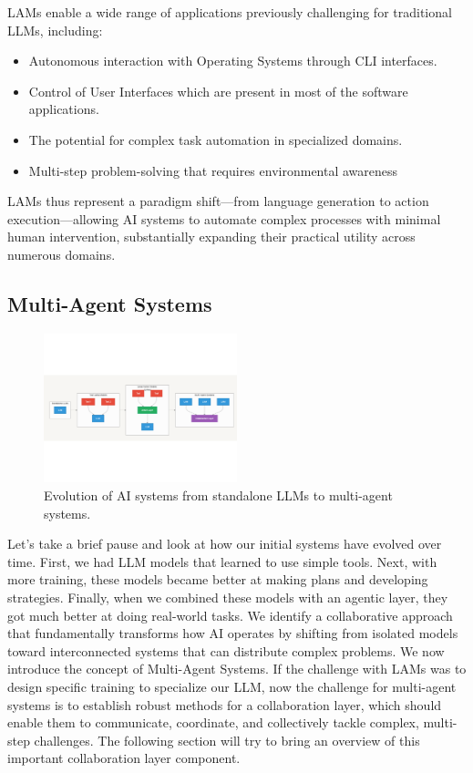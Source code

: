 \documentclass[journal,twoside,10pt]{IEEEtran}
\begin{document}
LAMs enable a wide range of applications previously challenging for traditional LLMs, including:

\begin{itemize}
    \item Autonomous interaction with Operating Systems through CLI interfaces.
    \item Control of User Interfaces which are present in most of the software applications.
    \item The potential for complex task automation in specialized domains.
    \item Multi-step problem-solving that requires environmental awareness
\end{itemize}

LAMs thus represent a paradigm shift—from language generation to action execution—allowing AI systems to automate complex processes with minimal human intervention, substantially expanding their practical utility across numerous domains.

\subsection{Multi-Agent Systems}

\begin{figure}[htbp]
    \centering
    \includegraphics[width=0.5\textwidth, trim=0 150pt 0 150pt, clip]{lams_diagram.pdf}
    \caption{Evolution of AI systems from standalone LLMs to multi-agent systems.}
    \label{fig:lam-evolution}
\end{figure}

Let's take a brief pause and look at how our initial systems have evolved over time. First, we had LLM models that learned to use simple tools. Next, with more training, these models became better at making plans and developing strategies. Finally, when we combined these models with an agentic layer, they got much better at doing real-world tasks. We identify a collaborative approach that fundamentally transforms how AI operates by shifting from isolated models toward interconnected systems that can distribute complex problems. We now introduce the concept of Multi-Agent Systems. If the challenge with LAMs was to design specific training to specialize our LLM, now the challenge for multi-agent systems is to establish robust methods for a collaboration layer, which should enable them to communicate, coordinate, and collectively tackle complex, multi-step challenges. The following section will try to bring an overview of this important collaboration layer component.
\end{document}
